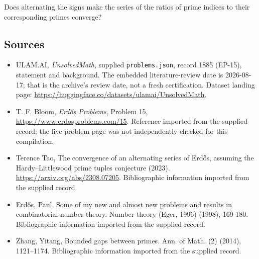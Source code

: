 \documentclass[11pt,a4paper]{article}
\begin{document}
Does alternating the signs make the series of the ratios of prime indices to their corresponding primes converge?

\subsection{Sources}

{\small

\begin{itemize}

\item[\hypertarget{source:1885:1}{S1}] ULAM.AI, \emph{UnsolvedMath}, supplied \texttt{problems.json}, record 1885 (EP-15), statement and background. The embedded literature-review date is 2026-08-17; that is the archive’s review date, not a fresh certification. Dataset landing page: \url{https://huggingface.co/datasets/ulamai/UnsolvedMath}.

\item[\hypertarget{source:1885:2}{S2}] T. F. Bloom, \emph{Erdős Problems}, Problem 15, \url{https://www.erdosproblems.com/15}. Reference imported from the supplied record; the live problem page was not independently checked for this compilation.

\item[\hypertarget{source:1885:3}{S3}] Terence Tao, The convergence of an alternating series of Erdős, assuming the Hardy--Littlewood prime tuples conjecture (2023). \url{https://arxiv.org/abs/2308.07205}. Bibliographic information imported from the supplied record.

\item[\hypertarget{source:1885:4}{S4}] Erd\H{o}s, Paul, Some of my new and almost new problems and results in combinatorial number theory. Number theory (Eger, 1996) (1998), 169-180. Bibliographic information imported from the supplied record.

\item[\hypertarget{source:1885:5}{S5}] Zhang, Yitang, Bounded gaps between primes. Ann. of Math. (2) (2014), 1121--1174. Bibliographic information imported from the supplied record.

\end{itemize}

}

\label{end:1885}
\end{document}
